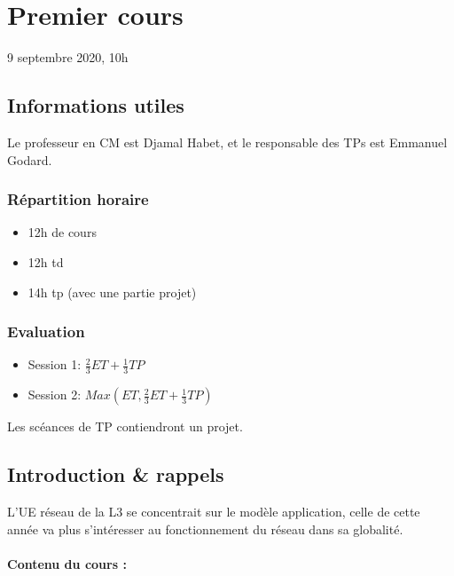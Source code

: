 \hypertarget{premier-cours}{%
\section{Premier cours}\label{premier-cours}}

9 septembre 2020, 10h

\hypertarget{informations-utiles}{%
\subsection{Informations utiles}\label{informations-utiles}}

Le professeur en CM est Djamal Habet, et le responsable des TPs est
Emmanuel Godard.

\subsubsection{Répartition horaire}

\begin{itemize}
\tightlist
\item
  12h de cours
\item
  12h td
\item
  14h tp (avec une partie projet)
\end{itemize}

\subsubsection{Evaluation}

\begin{itemize}
\tightlist
\item
  Session 1: \(\frac{2}{3}ET+\frac{1}{3}TP\)
\item
  Session 2: \(Max(ET, \frac{2}{3}ET+\frac{1}{3}TP)\)
\end{itemize}

Les scéances de TP contiendront un projet.

\hypertarget{introduction-rappels}{%
\subsection{Introduction \& rappels}\label{introduction-rappels}}

L'UE réseau de la L3 se concentrait sur le modèle application, celle de
cette année va plus s'intéresser au fonctionnement du réseau dans sa
globalité.

\paragraph{Contenu du cours :}

